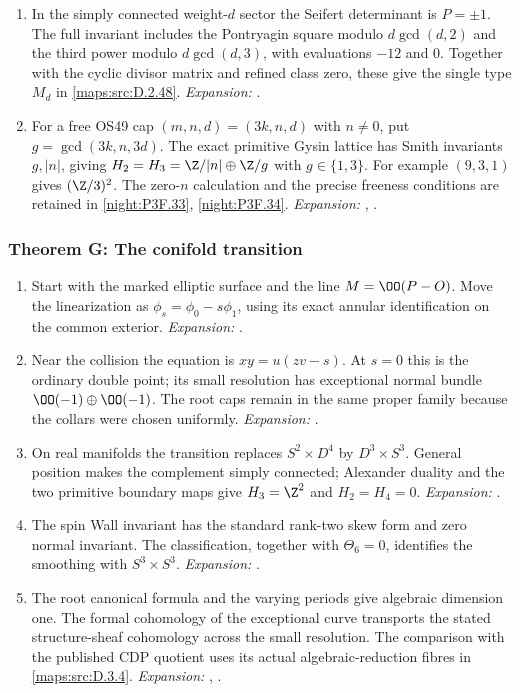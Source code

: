 \begin{enumerate}[label=\arabic*.,leftmargin=*]
\item\hypertarget{step-III-F-6}{} In the simply connected weight-$d$ sector the Seifert
determinant is $P=\pm1$.  The full invariant includes the
Pontryagin square modulo $d\gcd(d,2)$ and the third power
modulo $d\gcd(d,3)$, with evaluations $-12$ and $0$.
Together with the cyclic divisor matrix and refined class zero,
these give the single type $M_d$ in \cref{maps:src:D.2.48}.
\textit{Expansion:} .
\item\hypertarget{step-III-F-7}{} For a free OS49 cap $(m,n,d)=(3k,n,d)$ with $n\ne0$,
put $g=\gcd(3k,n,3d)$.  The exact primitive Gysin lattice has
Smith invariants $g,|n|$, giving
$H_2=H_3=\Z/|n|\oplus\Z/g$ with $g\in\{1,3\}$.
For example $(9,3,1)$ gives $(\Z/3)^2$.
The zero-$n$ calculation and the precise freeness conditions are
retained in \cref{night:P3F.33}, \cref{night:P3F.34}.
\textit{Expansion:} , .
\end{enumerate}

\hypertarget{outline-III-G}{}
\subsubsection*{Theorem G: The conifold transition}
\begin{enumerate}[label=\arabic*.,leftmargin=*]
\item\hypertarget{step-III-G-1}{} Start with the marked elliptic surface and the line
$M=\OO(P-O)$.  Move the linearization as $\phi_s=\phi_0-s\phi_1$,
using its exact annular identification on the common exterior.
\textit{Expansion:} .
\item\hypertarget{step-III-G-2}{} Near the collision the equation is
$xy=u(zv-s)$.  At $s=0$ this is the ordinary double point;
its small resolution has exceptional normal bundle
$\OO(-1)\oplus\OO(-1)$.  The root caps remain in the same
proper family because the collars were chosen uniformly.
\textit{Expansion:} .
\item\hypertarget{step-III-G-3}{} On real manifolds the transition replaces $S^2\times D^4$
by $D^3\times S^3$.  General position makes the complement
simply connected; Alexander duality and the two primitive boundary
maps give $H_3=\Z^2$ and $H_2=H_4=0$.
\textit{Expansion:} .
\item\hypertarget{step-III-G-4}{} The spin Wall invariant has the standard rank-two skew form
and zero normal invariant.  The classification, together with
$\Theta_6=0$, identifies the smoothing with $S^3\times S^3$.
\textit{Expansion:} .
\item\hypertarget{step-III-G-5}{} The root canonical formula and the varying periods give
algebraic dimension one.  The formal cohomology of the exceptional
curve transports the stated structure-sheaf cohomology across the
small resolution.  The comparison with the published CDP quotient
uses its actual algebraic-reduction fibres in
\cref{maps:src:D.3.4}.
\textit{Expansion:} , .
\end{enumerate}

